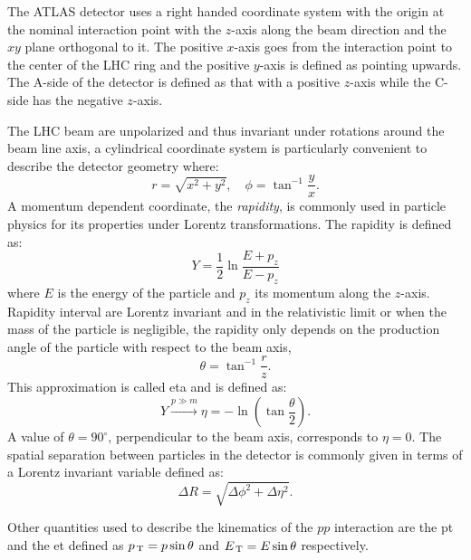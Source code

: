 The ATLAS detector uses a right handed coordinate system with the origin at the
nominal interaction point with the $z$-axis along the beam direction and the
$xy$ plane orthogonal to it. The positive $x$-axis goes from the interaction
point to the center of the LHC ring and the positive $y$-axis is defined as
pointing upwards. The A-side of the detector is defined as that with a positive
$z$-axis while the C-side has the negative $z$-axis.

The LHC beam are unpolarized and thus invariant under rotations around the beam
line axis, a cylindrical coordinate system is particularly convenient to
describe the detector geometry where:
\begin{equation}
  \label{eq:57}
  r = \sqrt{x^2 + y^2}, \quad \phi = \tan^{-1} \frac{y}{x}.
\end{equation}
A momentum dependent coordinate, the \emph{rapidity}, is commonly used in
particle physics for its properties under Lorentz transformations. The rapidity
is defined as:
\begin{equation}
  \label{eq:58}
  Y = \frac{1}{2} \ln \frac{E + p_z}{E - p_z}
\end{equation}
where $E$ is the energy of the particle and $p_z$ its momentum along the
$z$-axis. Rapidity interval are Lorentz invariant and in the relativistic limit
or when the mass of the particle is negligible, the rapidity only depends on the
production angle of the particle with respect to the beam axis,
\begin{equation}
  \label{eq:59}
  \theta = \tan^{-1} \frac{r}{z}.
\end{equation}
This approximation is called \gls{eta} and is defined as:
\begin{equation}
  \label{eq:60}
  Y \xrightarrow{p \gg m} \eta = - \ln \left( \tan \frac{\theta}{2} \right).
\end{equation}
A value of $\theta = 90^{\circ}$, perpendicular to the beam axis, corresponds to
$\eta = 0$. The spatial separation between particles in the detector is commonly
given in terms of a Lorentz invariant variable defined as:
\begin{equation}
  \label{eq:61}
  \Delta R = \sqrt{\Delta \phi^2 + \Delta \eta^2}.
\end{equation}

Other quantities used to describe the kinematics of the $pp$ interaction are the
\gls{pt} and the \gls{et} defined as $p_\mathrm{\, T} = p \sin \theta$ and
$E_\mathrm{\, T} = E \sin \theta$ respectively.
